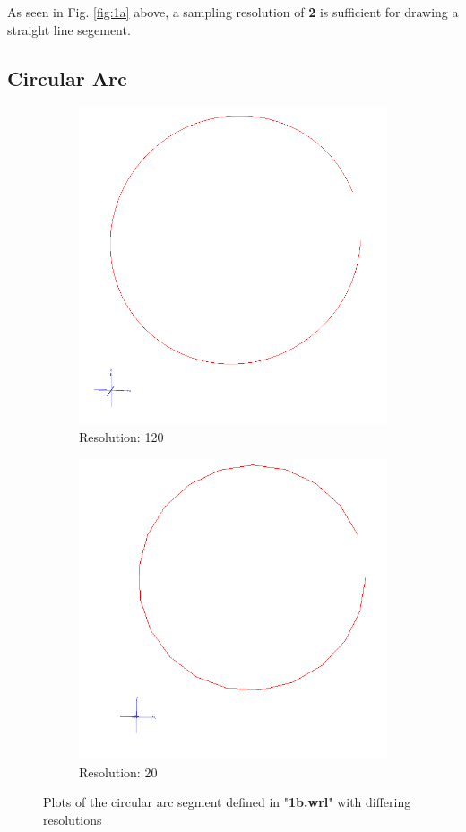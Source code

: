 \documentclass[acmlarge,nonacm=true]{acmart}
\begin{document}
As seen in Fig. \ref{fig:1a} above, a sampling resolution of \textbf{2} is sufficient for drawing a straight line segement.

\subsection{Circular Arc}
\begin{figure}[H]
	\begin{subfigure}{.4\textwidth}
	  \centering
	  \includegraphics[width=.8\linewidth]{fig/1b120}
	  \caption{Resolution: 120}
	\end{subfigure}%
	\begin{subfigure}{.4\textwidth}
	  \centering
	  \includegraphics[width=.8\linewidth]{fig/1b20}
	  \caption{Resolution: 20}
	\end{subfigure}
	\caption{Plots of the circular arc segment defined in "\textbf{1b.wrl}" with differing resolutions}
	\label{fig:1b}
\end{figure}
\end{document}
